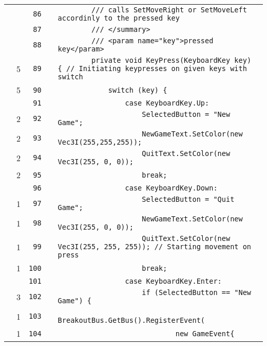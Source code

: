 \documentclass[a4paper,landscape,10pt]{article}
\begin{document}
\begin{longtable}[l]{lrrll}
\cellcolor{gray} &  & \verb~86~ & & \verb~        /// calls SetMoveRight or SetMoveLeft accordinly to the pressed key~\\
\cellcolor{gray} &  & \verb~87~ & & \verb~        /// </summary>~\\
\cellcolor{gray} &  & \verb~88~ & & \verb~        /// <param name="key">pressed key</param>~\\
\cellcolor{green} & 5 & \verb~89~ & & \verb~        private void KeyPress(KeyboardKey key) { // Initiating keypresses on given keys with switch~\\
\cellcolor{green} & 5 & \verb~90~ & & \verb~            switch (key) {~\\
\cellcolor{gray} &  & \verb~91~ & & \verb~                case KeyboardKey.Up:~\\
\cellcolor{green} & 2 & \verb~92~ & & \verb~                    SelectedButton = "New Game";~\\
\cellcolor{green} & 2 & \verb~93~ & & \verb~                    NewGameText.SetColor(new Vec3I(255,255,255));~\\
\cellcolor{green} & 2 & \verb~94~ & & \verb~                    QuitText.SetColor(new Vec3I(255, 0, 0));~\\
\cellcolor{green} & 2 & \verb~95~ & & \verb~                    break;~\\
\cellcolor{gray} &  & \verb~96~ & & \verb~                case KeyboardKey.Down:~\\
\cellcolor{green} & 1 & \verb~97~ & & \verb~                    SelectedButton = "Quit Game";~\\
\cellcolor{green} & 1 & \verb~98~ & & \verb~                    NewGameText.SetColor(new Vec3I(255, 0, 0));~\\
\cellcolor{green} & 1 & \verb~99~ & & \verb~                    QuitText.SetColor(new Vec3I(255, 255, 255)); // Starting movement on press~\\
\cellcolor{green} & 1 & \verb~100~ & & \verb~                    break;~\\
\cellcolor{gray} &  & \verb~101~ & & \verb~                case KeyboardKey.Enter:~\\
\cellcolor{green} & 3 & \verb~102~ & & \verb~                    if (SelectedButton == "New Game") {~\\
\cellcolor{green} & 1 & \verb~103~ & & \verb~                        BreakoutBus.GetBus().RegisterEvent(~\\
\cellcolor{green} & 1 & \verb~104~ & & \verb~                            new GameEvent{~\\

\end{longtable}
\end{document}
